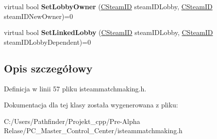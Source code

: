 \begin{DoxyCompactItemize}
\item 
\mbox{\label{class_i_steam_matchmaking_a48d0d64252c77988d56230ebc592d4b9}} 
virtual bool {\bfseries Set\+Lobby\+Owner} (\hyperlink{class_c_steam_i_d}{C\+Steam\+ID} steam\+I\+D\+Lobby, \hyperlink{class_c_steam_i_d}{C\+Steam\+ID} steam\+I\+D\+New\+Owner)=0
\item 
\mbox{\label{class_i_steam_matchmaking_a0d78ede35fb2a3faffa229d69ac3dadc}} 
virtual bool {\bfseries Set\+Linked\+Lobby} (\hyperlink{class_c_steam_i_d}{C\+Steam\+ID} steam\+I\+D\+Lobby, \hyperlink{class_c_steam_i_d}{C\+Steam\+ID} steam\+I\+D\+Lobby\+Dependent)=0
\end{DoxyCompactItemize}


\subsection{Opis szczegółowy}


Definicja w linii 57 pliku isteammatchmaking.\+h.



Dokumentacja dla tej klasy została wygenerowana z pliku\+:\begin{DoxyCompactItemize}
\item 
C\+:/\+Users/\+Pathfinder/\+Projekt\+\_\+cpp/\+Pre-\/\+Alpha Relase/\+P\+C\+\_\+\+Master\+\_\+\+Control\+\_\+\+Center/isteammatchmaking.\+h\end{DoxyCompactItemize}

